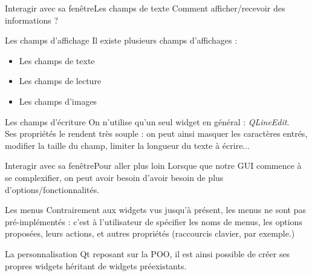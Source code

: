 \documentclass[12pt]{beamer}
\begin{document}
            \begin{frame}{Interagir avec sa fenêtre}{Les champs de texte}
                Comment afficher/recevoir des informations ?
                \begin{block}{Les champs d'affichage}
                    Il existe plusieurs champs d'affichages :
                    \begin{itemize}
                    \item{Les champs de texte}
                    \item{Les champs de lecture}
                    \item{Les champs d'images}
                    \end{itemize}
                \end{block}
                \begin{block}{Les champs d'écriture}
                    On n'utilise qu'un seul widget en général : \textit{QLineEdit}.\\ Ses propriétés le rendent très souple : on peut ainsi masquer les caractères entrés, modifier la taille du champ, limiter la longueur du texte à écrire...
                \end{block}
            \end{frame}
            
            \begin{frame}{Interagir avec sa fenêtre}{Pour aller plus loin}
                Lorsque que notre GUI commence à se complexifier, on peut avoir besoin d'avoir besoin de plus d'options/fonctionnalités.
                \begin{block}{Les menus}
                    Contrairement aux widgets vus jusqu'à présent, les menus ne sont pas pré-implémentés : c'est à l'utilisateur de spécifier les noms de menus, les options proposées, leurs actions, et autres propriétés (raccourcis clavier, par exemple.)
                \end{block}
                \begin{block}{La personnalisation}
                    Qt reposant sur la POO, il est ainsi possible de créer ses propres widgets héritant de widgets préexistants.
                \end{block}
            \end{frame}
            
            
            
\end{document}
